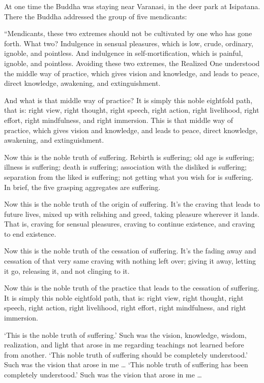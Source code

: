 \documentclass[12pt,openany]{book}%
\begin{document}
At one time the Buddha was staying near Varanasi, in the deer park at Isipatana. There the Buddha addressed the group of five mendicants: 

“Mendicants, these two extremes should not be cultivated by one who has gone forth. What two? Indulgence in sensual pleasures, which is low, crude, ordinary, ignoble, and pointless. And indulgence in self-mortification, which is painful, ignoble, and pointless. Avoiding these two extremes, the Realized One understood the middle way of practice, which gives vision and knowledge, and leads to peace, direct knowledge, awakening, and extinguishment. 

And what is that middle way of practice? It is simply this noble eightfold path, that is: right view, right thought, right speech, right action, right livelihood, right effort, right mindfulness, and right immersion. This is that middle way of practice, which gives vision and knowledge, and leads to peace, direct knowledge, awakening, and extinguishment. 

Now this is the noble truth of suffering. Rebirth is suffering; old age is suffering; illness is suffering; death is suffering; association with the disliked is suffering; separation from the liked is suffering; not getting what you wish for is suffering. In brief, the five grasping aggregates are suffering. 

Now this is the noble truth of the origin of suffering. It’s the craving that leads to future lives, mixed up with relishing and greed, taking pleasure wherever it lands. That is, craving for sensual pleasures, craving to continue existence, and craving to end existence. 

Now this is the noble truth of the cessation of suffering. It’s the fading away and cessation of that very same craving with nothing left over; giving it away, letting it go, releasing it, and not clinging to it. 

Now this is the noble truth of the practice that leads to the cessation of suffering. It is simply this noble eightfold path, that is: right view, right thought, right speech, right action, right livelihood, right effort, right mindfulness, and right immersion. 

‘This is the noble truth of suffering.’ Such was the vision, knowledge, wisdom, realization, and light that arose in me regarding teachings not learned before from another. ‘This noble truth of suffering should be completely understood.’ Such was the vision that arose in me … ‘This noble truth of suffering has been completely understood.’ Such was the vision that arose in me … 
\end{document}
